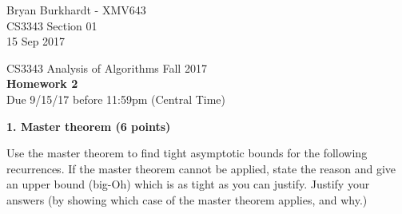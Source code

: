 \documentclass[12pt]{elsart}
\begin{document}
\pagestyle{empty}
Bryan Burkhardt - XMV643\\
CS3343 Section 01\\
15 Sep 2017\\

\begin{center}
\Large  CS3343 Analysis of Algorithms Fall 2017 \\
\large {\bf Homework 2}\\
\normalsize Due 9/15/17 before 11:59pm (Central Time)
\end{center}

{\bf 1.  Master theorem (6 points)}

Use the master theorem to find tight asymptotic bounds for the following
recurrences. If the master theorem cannot be applied, state the reason and give an upper bound (big-Oh) which is as tight as you can justify.  Justify your answers (by showing which case of the master theorem
applies, and why.) %
\end{document}
